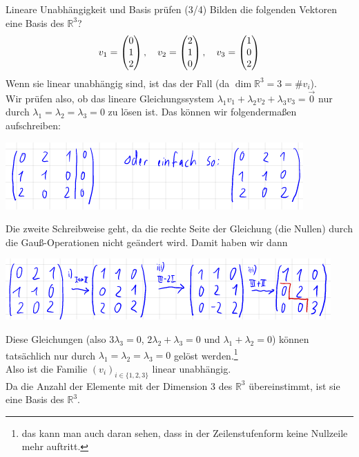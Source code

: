 \begin{Beispiel}
{Lineare Unabhängigkeit und Basis prüfen (3/4)}
Bilden die folgenden Vektoren eine Basis des $\mathbb{R}^3$?
\begin{equation*}
    v_1=\begin{pmatrix}0\\1\\2\end{pmatrix},\quad v_2=\begin{pmatrix}2\\1\\0\end{pmatrix},\quad v_3=\begin{pmatrix}1\\0\\2\end{pmatrix}
\end{equation*}
Wenn sie linear unabhängig sind, ist das der Fall (da $\dim \mathbb{R}^3=3=\#v_i$).\\
Wir prüfen also, ob das lineare Gleichungssystem $\lambda_1v_1+\lambda_2v_2+\lambda_3v_3=\Vec{0}$ nur durch $\lambda_1=\lambda_2=\lambda_3=0$ zu lösen ist. Das können wir folgendermaßen aufschreiben:
\begin{center}
    \includegraphics[width=.4\textwidth]{Dateien/00/11GaussC1.PNG}
\end{center}
Die zweite Schreibweise geht, da die rechte Seite der Gleichung (die Nullen) durch die Gauß-Operationen nicht geändert wird. Damit haben wir dann
\begin{center}
    \includegraphics[width=.5\textwidth]{Dateien/00/11GaussC2.PNG}
\end{center}
Diese Gleichungen (also $3\lambda_3=0$, $2\lambda_2+\lambda_3=0$ und $\lambda_1+\lambda_2=0$) können tatsächlich nur durch $\lambda_1=\lambda_2=\lambda_3=0$ gelöst werden.\footnote{das kann man auch daran sehen, dass in der Zeilenstufenform keine Nullzeile mehr auftritt.}\\
Also ist die Familie $(v_i)_{i\in\{1,2,3\}}$ linear unabhängig.\\
Da die Anzahl der Elemente mit der Dimension 3 des $\mathbb{R}^3$ übereinstimmt, ist sie eine Basis des $\mathbb{R}^3$.
\end{Beispiel}
